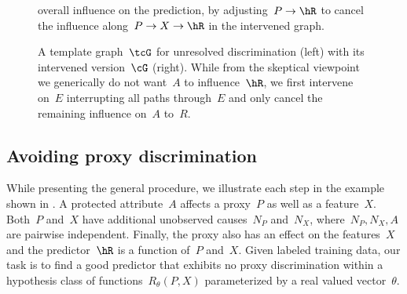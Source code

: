 \begin{figure}
\begin{center}
\begin{minipage}{0.5\textwidth}
{    overall influence on the prediction, by adjusting~$P \to \hR$ to cancel the
    influence along~$P \to X \to \hR$ in the intervened graph.}
  \label{fig:proxytemplate}
  \end{minipage}%
  \hfill
  \begin{minipage}{0.45\textwidth}
    \hspace{0.5cm}
    \caption{A template graph~$\tcG$ for unresolved discrimination (left) with
    its intervened version~$\cG$ (right). While from the skeptical viewpoint we generically do not want~$A$
    to influence~$\hR$, we first intervene on~$E$ interrupting all paths
    through~$E$ and only cancel the remaining influence on~$A$ to~$R$.}
    \label{fig:explanatorytemplate}
  \end{minipage}
\end{center}
\end{figure}

\subsection{Avoiding proxy discrimination}
\label{subsec:proxydiscrimination}

While presenting the general procedure, we illustrate each step in the example
shown in . A protected attribute~$A$ affects a
proxy~$P$ as well as a feature~$X$. Both~$P$ and~$X$ have additional unobserved
causes~$N_P$ and~$N_X$, where~$N_P, N_X, A$ are pairwise independent. Finally,
the proxy also has an effect on the features~$X$ and the predictor~$\hR$ is
a function of~$P$ and~$X$. Given labeled training data, our task is to find a
good predictor that exhibits no proxy discrimination within a hypothesis class
of functions~$R_{\theta}(P, X)$ parameterized by a real valued vector~$\theta$.

